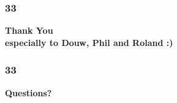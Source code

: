 \documentclass{beamer}
\begin{document}
\begin{frame}
\frametitle{33}
\vspace{5mm}
\centering
\bf{\Huge Thank You}\\

\hspace{20mm} especially to Douw, Phil and Roland :)
\end{frame}

\begin{frame}
\frametitle{33}
\vspace{5mm}
\centering
\bf{\Huge Questions?}\\
\end{frame}
\end{document}
